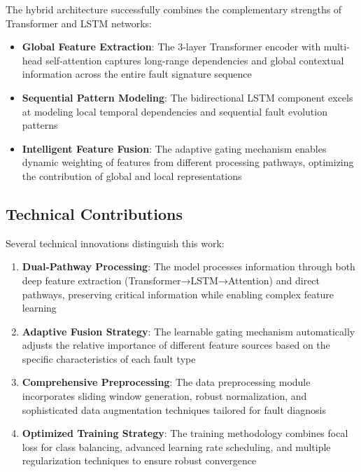 The hybrid architecture successfully combines the complementary strengths of Transformer and LSTM networks:

\begin{itemize}
    \item \textbf{Global Feature Extraction}: The 3-layer Transformer encoder with multi-head self-attention captures long-range dependencies and global contextual information across the entire fault signature sequence
    \item \textbf{Sequential Pattern Modeling}: The bidirectional LSTM component excels at modeling local temporal dependencies and sequential fault evolution patterns
    \item \textbf{Intelligent Feature Fusion}: The adaptive gating mechanism enables dynamic weighting of features from different processing pathways, optimizing the contribution of global and local representations
\end{itemize}

\subsection{Technical Contributions}
\label{subsec:technical_contributions}

Several technical innovations distinguish this work:

\begin{enumerate}
    \item \textbf{Dual-Pathway Processing}: The model processes information through both deep feature extraction (Transformer→LSTM→Attention) and direct pathways, preserving critical information while enabling complex feature learning
    
    \item \textbf{Adaptive Fusion Strategy}: The learnable gating mechanism automatically adjusts the relative importance of different feature sources based on the specific characteristics of each fault type
    
    \item \textbf{Comprehensive Preprocessing}: The data preprocessing module incorporates sliding window generation, robust normalization, and sophisticated data augmentation techniques tailored for fault diagnosis
    
    \item \textbf{Optimized Training Strategy}: The training methodology combines focal loss for class balancing, advanced learning rate scheduling, and multiple regularization techniques to ensure robust convergence
\end{enumerate}

